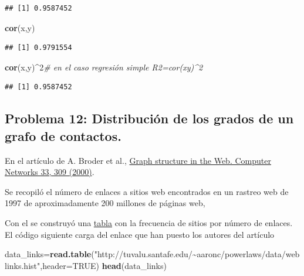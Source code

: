 \documentclass[
]{article}
\newenvironment{Shaded}{\begin{snugshade}}{\end{snugshade}}
\newcommand{\CommentTok}[1]{\textcolor[rgb]{0.56,0.35,0.01}{\textit{#1}}}
\newcommand{\DataTypeTok}[1]{\textcolor[rgb]{0.13,0.29,0.53}{#1}}
\newcommand{\DecValTok}[1]{\textcolor[rgb]{0.00,0.00,0.81}{#1}}
\newcommand{\KeywordTok}[1]{\textcolor[rgb]{0.13,0.29,0.53}{\textbf{#1}}}
\newcommand{\NormalTok}[1]{#1}
\newcommand{\OperatorTok}[1]{\textcolor[rgb]{0.81,0.36,0.00}{\textbf{#1}}}
\newcommand{\OtherTok}[1]{\textcolor[rgb]{0.56,0.35,0.01}{#1}}
\newcommand{\StringTok}[1]{\textcolor[rgb]{0.31,0.60,0.02}{#1}}
\begin{document}
\begin{verbatim}
## [1] 0.9587452
\end{verbatim}

\begin{Shaded}
\begin{Highlighting}[]
\KeywordTok{cor}\NormalTok{(x,y)}
\end{Highlighting}
\end{Shaded}

\begin{verbatim}
## [1] 0.9791554
\end{verbatim}

\begin{Shaded}
\begin{Highlighting}[]
\KeywordTok{cor}\NormalTok{(x,y)}\OperatorTok{\^{}}\DecValTok{2}\CommentTok{\# en el caso regresión simple  R2=cor(xy)\^{}2}
\end{Highlighting}
\end{Shaded}

\begin{verbatim}
## [1] 0.9587452
\end{verbatim}

\hypertarget{problema-12-distribuciuxf3n-de-los-grados-de-un-grafo-de-contactos.}{%
\subsection{Problema 12: Distribución de los grados de un grafo de
contactos.}\label{problema-12-distribuciuxf3n-de-los-grados-de-un-grafo-de-contactos.}}

En el artículo de A. Broder et al.,
\href{http://snap.stanford.edu/class/cs224w-readings/broder00bowtie.pdf}{Graph
structure in the Web. Computer Networks 33, 309 (2000)}.

Se recopiló el número de enlaces a sitios web encontrados en un rastreo
web de 1997 de aproximadamente 200 millones de páginas web,

Con el se construyó una
\href{http://tuvalu.santafe.edu/~aaronc/powerlaws/data/weblinks.hist}{tabla}
con la frecuencia de sitios por número de enlaces. El código siguiente
carga del enlace que han puesto los autores del artículo

\begin{Shaded}
\begin{Highlighting}[]
\NormalTok{data\_links=}\KeywordTok{read.table}\NormalTok{(}\StringTok{"http://tuvalu.santafe.edu/\textasciitilde{}aaronc/powerlaws/data/weblinks.hist"}\NormalTok{,}\DataTypeTok{header=}\OtherTok{TRUE}\NormalTok{)}
\KeywordTok{head}\NormalTok{(data\_links)}
\end{Highlighting}
\end{Shaded}
\end{document}
